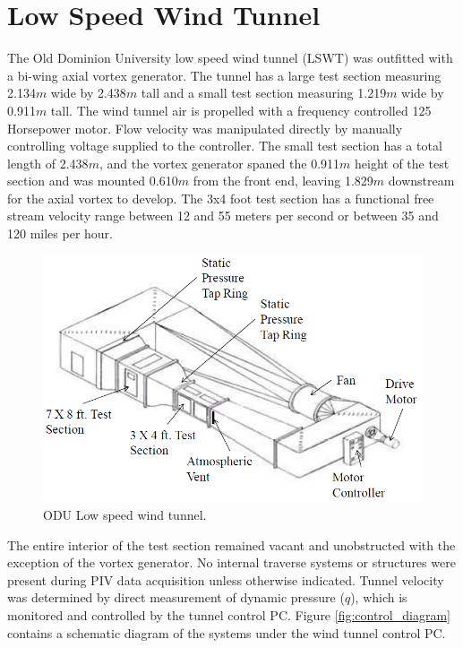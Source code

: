
\section{Low Speed Wind Tunnel}

The Old Dominion University low 
speed wind tunnel (LSWT) was outfitted with a bi-wing axial vortex generator. 
The tunnel has a large test section measuring 2.134$m$ wide by 2.438$m$ 
tall and a small test section measuring 1.219$m$ wide by 0.911$m$ tall. The 
wind tunnel air is propelled with a frequency controlled 125 Horsepower motor. 
Flow velocity was manipulated directly by manually controlling
voltage supplied to the controller. 
The small test section has a total length of 2.438$m$, and the vortex generator 
spaned the 0.911$m$ height of the test section and was 
mounted 0.610$m$ from the front end, leaving 1.829$m$ downstream for the axial 
vortex to develop. The 3x4 foot test section has a functional free stream 
velocity range between 12 and 55 meters per second or between 35 and 120 miles 
per hour.

\begin{figure}[H]
\centering
\includegraphics[width=5in]{figs/setup/odulswt_diagram}
\caption{ODU Low speed wind tunnel.}
\label{fig:odulswt}
\end{figure}

The entire interior of the test section remained vacant and unobstructed with 
the exception of the vortex generator. 
No internal traverse systems or structures 
were present during PIV data acquisition unless otherwise indicated. Tunnel 
velocity was determined by direct measurement of dynamic pressure ($q$), which 
is monitored and controlled by the tunnel control PC. Figure 
\ref{fig:control_diagram} contains a schematic diagram of the systems under the 
wind tunnel control PC.

